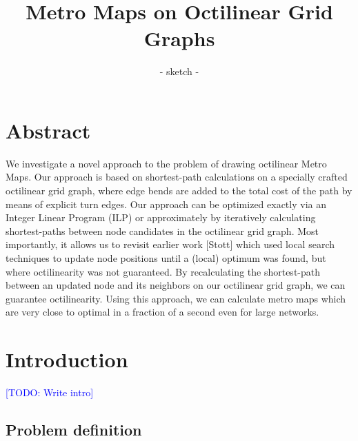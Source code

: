 \documentclass{sig-alternate-sigmod09}
\newcommand\TODO[1]{\textcolor{blue}{\small [TODO: #1]}}
\begin{document}
\title{Metro Maps on Octilinear Grid Graphs}
\subtitle{- sketch -}


\maketitle

\section{Abstract}

We investigate a novel approach to the problem of drawing octilinear Metro Maps.
Our approach is based on shortest-path calculations on a specially crafted octilinear grid graph, where edge bends are added to the total cost of the path by means of explicit turn edges.
Our approach can be optimized exactly via an Integer Linear Program (ILP) or approximately by iteratively calculating shortest-paths between node candidates in the octilinear grid graph.
Most importantly, it allows us to revisit earlier work [Stott] which used local search techniques to update node positions until a (local) optimum was found, but where octilinearity was not guaranteed.
By recalculating the shortest-path between an updated node and its neighbors on our octilinear grid graph, we can guarantee octilinearity.
Using this approach, we can calculate metro maps which are very close to optimal in a fraction of a second even for large networks.

\section{Introduction}

\TODO{Write intro}

\subsection{Problem definition}
\end{document}
